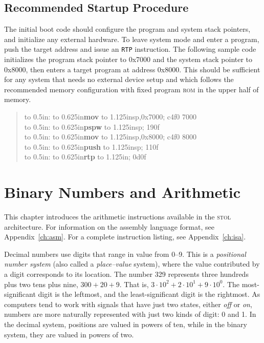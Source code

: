 \documentclass[12pt,english]{book}
\newcommand*{\asmstyle}{\noindent\ttfamily\selectfont\small}
\newcommand*{\asmline}[3][]{%
\null\hbox to 0.5in{\ifx#1\empty\else{#1}:\fi\hss}%
\hbox to 0.625in{\textbf{#2}\hss}%
\hbox to 1.125in{#3\hss}}
\newcommand*{\concept}[2][]{%
  \textit{#2}\ifx#1\empty\empty\index{#2}\else\index{#1}\fi}
\begin{document}
\section{Recommended Startup Procedure}
The initial boot code should
configure the program and system stack pointers,
and initialize any external hardware.
To leave system mode and enter a program,
push the target address and issue an \texttt{RTP} instruction.
The following sample code initializes
the program stack pointer to 0x7000
and the system stack pointer to 0x8000,
then enters a target program at address 0x8000.
This should be sufficient for any system
that needs no external device setup
and which follows
the recommended memory configuration
with fixed program \textsc{rom} in the upper half of memory.

\begin{quote}\asmstyle
\asmline{mov}{sp,0x7000}; c4f0 7000\\
\asmline{pspw}{sp}; 190f\\
\asmline{mov}{sp,0x8000}; c4f0 8000\\
\asmline{push}{sp}; 110f\\
\asmline{rtp}{}; 0d0f
\end{quote}


\chapter{Binary Numbers and Arithmetic}\label{ch:arith}
This chapter introduces the arithmetic instructions
available in the \textsc{stol} architecture.
For information on the assembly language format,
see Appendix~\ref{ch:asm}.
For a complete instruction listing, see Appendix~\ref{ch:isa}.

Decimal numbers use digits that range in value from 0--9.
This is a \concept{positional number system}
(also called a \emph{place--value} system),
where the value contributed by a digit corresponds to its location.
The number 329 represents three hundreds plus two tens plus nine,
\(300+20+9\).
That is, \(3\cdot 10^2 + 2\cdot 10^1 + 9\cdot 10^0\).
The most-significant digit is the leftmost,
and the least-significant digit is the rightmost.
As computers tend to work with signals
that have just two states, either \emph{off} or \emph{on},
numbers are more naturally represented with just two kinds of digit:
0 and 1.
In the decimal system, positions are valued in powers of ten,
while in the binary system, they are valued in powers of two.
\end{document}
